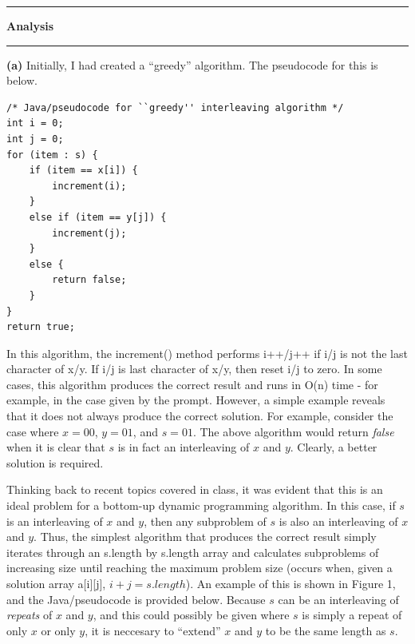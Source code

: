 \documentclass[11pt]{article}
\newcommand\question[2]{\vspace{.25in}\hrule\textbf{#1 #2}\vspace{.5em}\hrule\vspace{.10in}}
\renewcommand\part[1]{\vspace{.10in}\textbf{(#1)}}
\begin{document}
\raggedright
\newcommand\NAME{Sean Connor (443-414-5111)}  %
\newcommand\HWNUM{ PA3}              %
\question{Analysis}{}
\part{a} 
Initially, I had created a ``greedy'' algorithm. The pseudocode for this is below.
\begin{lstlisting}
/* Java/pseudocode for ``greedy'' interleaving algorithm */
int i = 0;
int j = 0;
for (item : s) {
	if (item == x[i]) {
		increment(i);
	}
	else if (item == y[j]) {
		increment(j);
	}
	else {
		return false;
	}
}
return true;
\end{lstlisting}
In this algorithm, the increment() method performs i++/j++ if i/j is not the last character of x/y. If i/j is last character of x/y, then reset i/j to zero. In some cases, this algorithm produces the correct result and runs in O(n) time - for example, in the case given by the prompt. However, a simple example reveals that it does not always produce the correct solution. For example, consider the case where $x=00$, $y=01$, and $s=01$. The above algorithm would return \textit{false} when it is clear that $s$ is in fact an interleaving of $x$ and $y$. Clearly, a better solution is required.

Thinking back to recent topics covered in class, it was evident that this is an ideal problem for a bottom-up dynamic programming algorithm. In this case, if $s$ is an interleaving of $x$ and $y$, then any subproblem of $s$ is also an interleaving of $x$ and $y$. Thus, the simplest algorithm that produces the correct result simply iterates through an s.length by s.length array and calculates subproblems of increasing size until reaching the maximum problem size (occurs when, given a solution array a[i][j], $i+j=s.length$). An example of this is shown in Figure 1, and the Java/pseudocode is provided below. Because $s$ can be an interleaving of \textit{repeats} of $x$ and $y$, and  this could possibly be given where $s$ is simply a repeat of only $x$ or only $y$, it is neccesary to ``extend'' $x$ and $y$ to be the same length as $s$.
\end{document}

